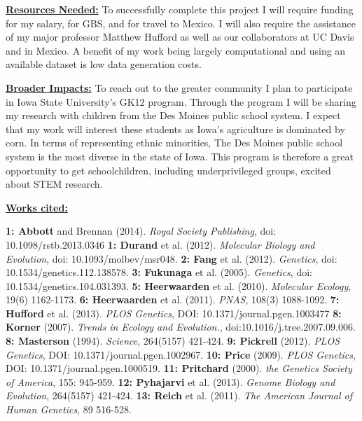 \documentclass[12pt]{amsart}
\begin{document}
\hfill\break \textbf{\underline{Resources Needed:} } To successfully complete this project I will require funding for my salary, for GBS, and for travel to Mexico.  I will also require the assistance of my major professor Matthew Hufford as well as our collaborators at UC Davis and in Mexico.
A benefit of my work being largely computational and using an available dataset is low data generation costs.

\hfill\break \textbf{\underline{Broader Impacts:} }
To reach out to the greater community I plan to participate in Iowa State University's GK12 program.  Through the program I will be sharing my research with children from the Des Moines public school system.  
I expect that my work will interest these students as Iowa's agriculture is dominated by corn.
In terms of representing ethnic minorities, The Des Moines public school system is the most diverse in the state of Iowa.  This program is therefore a great opportunity to get schoolchildren, including underprivileged groups, excited about STEM research.  

\hfill\break \textbf{\underline{Works cited:}}
\small{ 
\textbf{1: Abbott} and Brennan (2014). \textit{Royal Society Publishing}, doi: 10.1098/rstb.2013.0346
\textbf{1: Durand} et al. (2012). \textit{Molecular Biology and Evolution}, doi: 10.1093/molbev/msr048.
\textbf{2: Fang} et al. (2012). \textit{Genetics}, doi: 10.1534/genetics.112.138578. 
\textbf{3: Fukunaga} et al. (2005). \textit{Genetics}, doi: 10.1534/genetics.104.031393. 
\textbf{5: Heerwaarden} et al. (2010). \textit{Molecular Ecology}, 19(6) 1162-1173. 
\textbf{6: Heerwaarden} et al. (2011). \textit{PNAS}, 108(3) 1088-1092.  
\textbf{7: Hufford} et al. (2013). \textit{PLOS Genetics}, DOI: 10.1371/journal.pgen.1003477
\textbf{8: Korner} (2007). \textit{Trends in Ecology and Evolution.}, doi:10.1016/j.tree.2007.09.006.
\textbf{8: Masterson} (1994). \textit{Science}, 264(5157) 421-424.  
\textbf{9: Pickrell} (2012). \textit{PLOS Genetics}, DOI: 10.1371/journal.pgen.1002967. 
\textbf{10: Price} (2009). \textit{PLOS Genetics}, DOI: 10.1371/journal.pgen.1000519. 
\textbf{11: Pritchard} (2000). \textit{the Genetics Society of America}, 155: 945-959.  
\textbf{12: Pyhajarvi} et al. (2013). \textit{Genome Biology and Evolution}, 264(5157) 421-424.  
\textbf{13: Reich} et al. (2011). \textit{The American Journal of Human Genetics}, 89 516-528.

}
\end{document}
